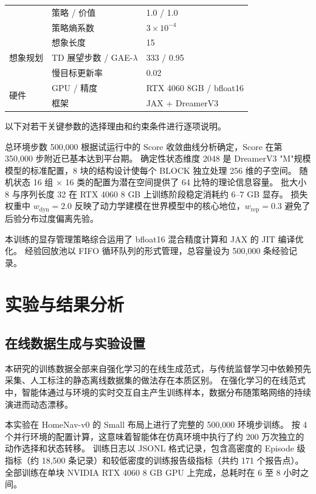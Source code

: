 \documentclass[12pt,a4paper]{ctexart}
\begin{document}
\begin{table}[H]
\begin{tabular}{@{}lll@{}}
        & 策略 / 价值 & 1.0 / 1.0 \\
        & 策略熵系数 & $3\times10^{-4}$ \\
        \midrule
        \multirow{3}{*}{想象规划} & 想象长度 & 15 \\
        & TD 展望步数 / GAE-$\lambda$ & 333 / 0.95 \\
        & 慢目标更新率 & 0.02 \\
        \midrule
        \multirow{2}{*}{硬件} & GPU / 精度 & RTX 4060 8GB / bfloat16 \\
        & 框架 & JAX + DreamerV3 \\
        \bottomrule
    \end{tabular}
\end{table}

以下对若干关键参数的选择理由和约束条件进行逐项说明。

总环境步数 500,000 根据试运行中的 Score 收敛曲线分析确定，Score 在第 350,000 步附近已基本达到平台期。
确定性状态维度 2048 是 DreamerV3 "M"规模模型的标准配置，8 块的结构设计使每个 BLOCK 独立处理 256 维的子空间。
随机状态 16 组 $\times$ 16 类的配置为潜在空间提供了 64 比特的理论信息容量。
批大小 8 与序列长度 32 在 RTX 4060 8 GB 上训练阶段稳定消耗约 6--7 GB 显存。
损失权重中 $w_{\text{dyn}} = 2.0$ 反映了动力学建模在世界模型中的核心地位，$w_{\text{rep}} = 0.3$ 避免了后验分布过度偏离先验。

本训练的显存管理策略综合运用了 bfloat16 混合精度计算和 JAX 的 JIT 编译优化。
经验回放池以 FIFO 循环队列的形式管理，总容量设为 500,000 条经验记录。

\section{实验与结果分析}

\subsection{在线数据生成与实验设置}

本研究的训练数据全部来自强化学习的在线生成范式，与传统监督学习中依赖预先采集、人工标注的静态离线数据集的做法存在本质区别。
在强化学习的在线范式中，智能体通过与环境的实时交互自主产生训练样本，数据分布随策略网络的持续演进而动态漂移。

本实验在 HomeNav-v0 的 Small 布局上进行了完整的 500,000 环境步训练。
按 4 个并行环境的配置计算，这意味着智能体在仿真环境中执行了约 200 万次独立的动作选择和状态转移。
训练日志以 JSONL 格式记录，包含高密度的 Episode 级指标（约 18,500 条记录）和较低密度的训练报告级指标（共约 171 个报告点）。
全部训练在单块 NVIDIA RTX 4060 8 GB GPU 上完成，总耗时在 6 至 8 小时之间。
\end{document}
